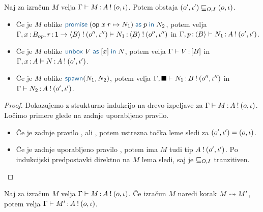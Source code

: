 \begin{lema}\label{lem:inversion-lema-2}
	Naj za izračun $M$ velja $\Gamma \vdash M \mathinner{:} A \mathbin{!} (o, \iota)$. Potem obstaja $(o', \iota') \sqsubseteq_{O, I} (o, \iota)$.
	\begin{itemize}
		\item Če je $M$ oblike $\tmwithrec{op}{x}{r}{N_1}{p}{N_2}$, potem velja $\Gamma, x \mathinner{:} B_{op}, r \mathinner{:} \mathsf{1} \to \langle B \rangle \mathbin{!} (o'', \iota'') \vdash N_1 \mathinner{:} \langle B \rangle \mathbin{!} (o'', \iota'')$ in $\Gamma, p \mathinner{:} \langle B \rangle \vdash N_1 \mathinner{:} A \mathbin{!} (o', \iota')$.
		
		\item Če je $M$ oblike $\tmunbox{V}{x}{N}$, potem velja $\Gamma \vdash V \mathinner{:} [B]$ in $\Gamma, x \mathinner{:} A \vdash N \mathinner{:} A \mathbin{!} (o', \iota')$.
		
		\item Če je $M$ oblike $\tmspawn{N_1}{N_2}$, potem velja $\Gamma, \blacksquare \vdash N_1 \mathinner{:} B \mathbin{!} (o'', \iota'')$ in $\Gamma \vdash N_2 \mathinner{:} A \mathbin{!} (o', \iota')$.
	\end{itemize}
\end{lema}

\begin{proof}
	Dokazujemo z strukturno indukcijo na drevo izpeljave za $\Gamma \vdash M \mathinner{:} A \mathbin{!} (o, \iota)$.
	Ločimo primere glede na zadnje uporabljeno pravilo.
	
	\begin{itemize}
		\item Če je zadnje pravilo ,  ali , potem ustrezna točka leme sledi za $(o', \iota') = (o, \iota)$.
		
		\item Če je zadnje uporabljeno pravilo , potem ima $M$ tudi tip $A \mathbin{!} (o', \iota')$. Po indukcijski predpostavki direktno na $M$ lema sledi, saj je $\sqsubseteq_{O, I}$ tranzitiven.
	\end{itemize}
\end{proof}


\begin{trditev}[o ohranitvi]\label{trd:ohranitev-izracuni-2}
	Naj za izračun $M$ velja $\Gamma \vdash M \mathinner{:} A \mathbin{!} (o, \iota)$. Če izračun $M$ naredi korak $M \leadsto M'$, potem velja $\Gamma \vdash M' \mathinner{:} A \mathbin{!} (o, \iota)$.
\end{trditev}


